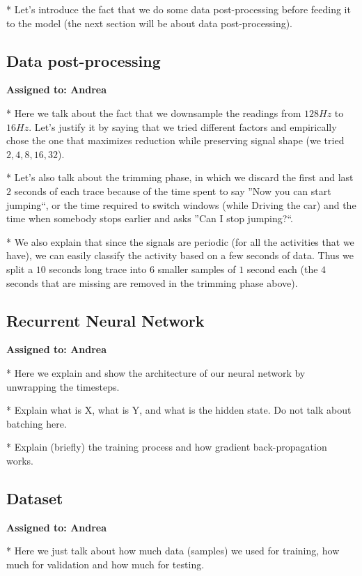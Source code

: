 \documentclass{article}
\begin{document}
* Let's introduce the fact that we do some data post-processing before feeding it to the model
(the next section will be about data post-processing).

\subsection{Data post-processing}
\vspace{-.3cm}
\textbf{Assigned to: Andrea}

* Here we talk about the fact that we downsample the readings from $128Hz$ to $16Hz$. Let's
justify it by saying that we tried different factors and empirically chose the one that maximizes
reduction while preserving signal shape (we tried $2, 4, 8, 16, 32$).

* Let's also talk about the trimming phase, in which we discard the first and last $2$ seconds
of each trace because of the time spent to say ''Now you can start jumping``, or the time
required to switch windows (while Driving the car) and the time when somebody stops earlier and
asks ''Can I stop jumping?``.

* We also explain that since the signals are periodic (for all the activities that we have), we can
easily classify the activity based on a few seconds of data. Thus we split a $10$ seconds long
trace into $6$ smaller samples of $1$ second each (the $4$ seconds that are missing are removed
in the trimming phase above).


\subsection{Recurrent Neural Network}
\vspace{-.3cm}
\textbf{Assigned to: Andrea}

* Here we explain and show the architecture of our neural network by unwrapping the timesteps.

* Explain what is X, what is Y, and what is the hidden state. Do not talk about batching here.

* Explain (briefly) the training process and how gradient back-propagation works.


\subsection{Dataset}
\vspace{-.3cm}
\textbf{Assigned to: Andrea}

* Here we just talk about how much data (samples) we used for training, how much for validation
and how much for testing.
\end{document}
